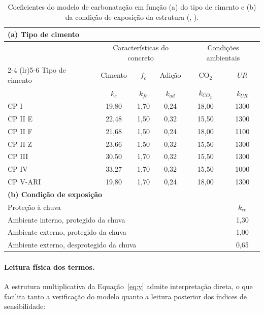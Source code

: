 \begin{table}[htbp]
\centering
\caption{Coeficientes do modelo de carbonatação em função (a) do tipo de cimento e (b) da condição de exposição da estrutura (\citeauthor{possan2010}, \citeyear{possan2010}).}
\label{tab:coef_possan}
\begin{tabular}{lccccc}
\toprule
\multicolumn{6}{l}{\textbf{(a) Tipo de cimento}} \\
\midrule
 & \multicolumn{3}{c}{Características do concreto} & \multicolumn{2}{c}{Condições ambientais} \\
\cmidrule(lr){2-4} \cmidrule(lr){5-6}
Tipo de cimento & Cimento & $f_c$ & Adição & CO$_2$ & $UR$ \\
                & $k_c$   & $k_{fc}$ & $k_{ad}$ & $k_{CO_2}$ & $k_{UR}$ \\
\midrule
CP I     & 19,80 & 1,70 & 0,24 & 18,00 & 1300 \\
CP II E  & 22,48 & 1,50 & 0,32 & 15,50 & 1300 \\
CP II F  & 21,68 & 1,50 & 0,24 & 18,00 & 1100 \\
CP II Z  & 23,66 & 1,50 & 0,32 & 15,50 & 1300 \\
CP III   & 30,50 & 1,70 & 0,32 & 15,50 & 1300 \\
CP IV    & 33,27 & 1,70 & 0,32 & 15,50 & 1000 \\
CP V-ARI & 19,80 & 1,70 & 0,24 & 18,00 & 1300 \\
\midrule
\multicolumn{6}{l}{\textbf{(b) Condição de exposição}} \\
\midrule
\multicolumn{5}{l}{Proteção à chuva} & $k_{ce}$ \\
\midrule
\multicolumn{5}{l}{Ambiente interno, protegido da chuva}     & 1,30 \\
\multicolumn{5}{l}{Ambiente externo, protegido da chuva}     & 1,00 \\
\multicolumn{5}{l}{Ambiente externo, desprotegido da chuva}  & 0,65 \\
\bottomrule
\end{tabular}
\end{table}

\paragraph{Leitura f\'isica dos termos.} A estrutura multiplicativa da Equação~\eqref{eq:y} admite interpretação direta, o que facilita tanto a verificação do modelo quanto a leitura posterior dos índices de sensibilidade:

